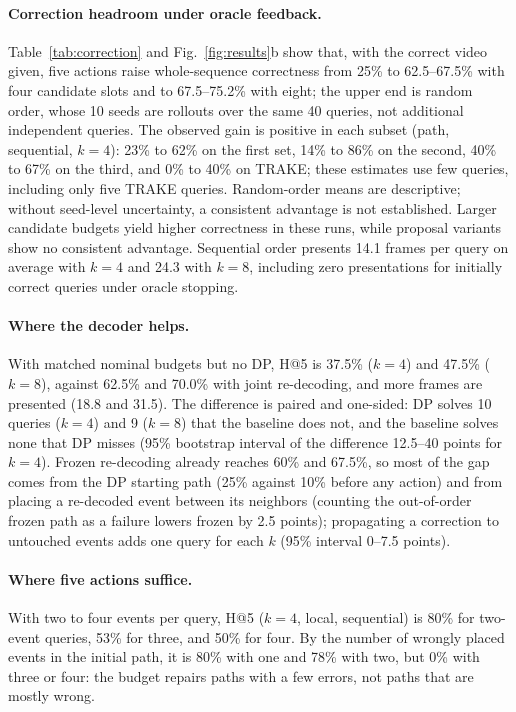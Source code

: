 \paragraph{Correction headroom under oracle feedback.}
Table~\ref{tab:correction} and Fig.~\ref{fig:results}b show that, with the correct video given, five actions raise whole-sequence correctness from 25\% to 62.5--67.5\% with four candidate slots and to 67.5--75.2\% with eight; the upper end is random order, whose 10 seeds are rollouts over the same 40 queries, not additional independent queries.
The observed gain is positive in each subset (path, sequential, $k=4$): 23\% to 62\% on the first set, 14\% to 86\% on the second, 40\% to 67\% on the third, and 0\% to 40\% on TRAKE; these estimates use few queries, including only five TRAKE queries.
Random-order means are descriptive; without seed-level uncertainty, a consistent advantage is not established.
Larger candidate budgets yield higher correctness in these runs, while proposal variants show no consistent advantage.
Sequential order presents 14.1 frames per query on average with $k=4$ and 24.3 with $k=8$, including zero presentations for initially correct queries under oracle stopping.

\paragraph{Where the decoder helps.}
With matched nominal budgets but no DP, H@5 is 37.5\% ($k=4$) and 47.5\% ($k=8$), against 62.5\% and 70.0\% with joint re-decoding, and more frames are presented (18.8 and 31.5).
The difference is paired and one-sided: DP solves 10 queries ($k=4$) and 9 ($k=8$) that the baseline does not, and the baseline solves none that DP misses (95\% bootstrap interval of the difference 12.5--40 points for $k=4$).
Frozen re-decoding already reaches 60\% and 67.5\%, so most of the gap comes from the DP starting path (25\% against 10\% before any action) and from placing a re-decoded event between its neighbors (counting the out-of-order frozen path as a failure lowers frozen by 2.5 points); propagating a correction to untouched events adds one query for each $k$ (95\% interval 0--7.5 points).

\paragraph{Where five actions suffice.}
With two to four events per query, H@5 ($k=4$, local, sequential) is 80\% for two-event queries, 53\% for three, and 50\% for four.
By the number of wrongly placed events in the initial path, it is 80\% with one and 78\% with two, but 0\% with three or four: the budget repairs paths with a few errors, not paths that are mostly wrong.

